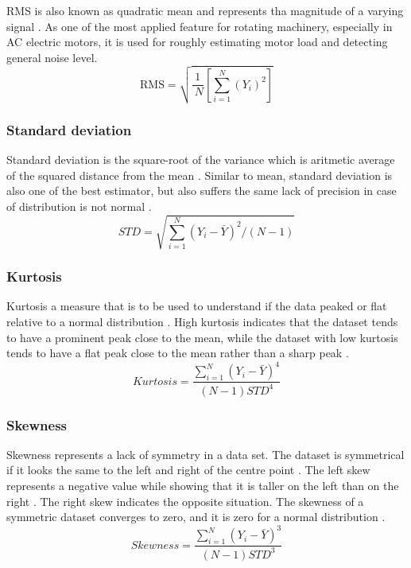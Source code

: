 RMS is also known as quadratic mean and represents tha magnitude of a varying signal \cite{sait2011review,shukla2015analysis}. As one of the most applied feature for rotating machinery, especially in AC electric motors, it is used for roughly estimating motor load and detecting general noise level.
\begin{equation}
\text{RMS}=\sqrt{\frac{1}{{~N}}\left[\sum_{{i}=1}^{{N}}\left({Y}_{{i}}\right)^{2}\right]}	
\label{RMS}
\end{equation}
\subsubsection{Standard deviation}

Standard deviation is the square-root of the variance which is aritmetic average of the squared distance from the mean \cite{shukla2015analysis}. Similar to mean, standard deviation is also one of the best estimator, but also suffers the same lack of precision in case of distribution is not normal \cite{croarkin2012handbook}.
\begin{equation}
\textit{STD}=\sqrt{\sum_{i=1}^{N}\left(Y_{i}-\bar{Y}\right)^{2} /(N-1)}
\label{std}
\end{equation}

\subsubsection{Kurtosis} 

Kurtosis a measure that is to be used to understand if the data peaked or flat relative to a normal distribution \cite{shukla2015analysis}. High kurtosis indicates that the dataset tends to have a prominent peak close to the mean, while the dataset with low kurtosis tends to have a flat peak close to the mean rather than a sharp peak \cite{croarkin2012handbook}.
\begin{equation}
\textit{Kurtosis}=\frac{\sum_{i=1}^{N}\left(Y_{i}-\bar{Y}\right)^{4}}{(N-1) STD^{4}}
\label{kurtosis}
\end{equation}
\subsubsection{Skewness} 

Skewness represents a lack of symmetry in a data set. The dataset is symmetrical if it looks the same to the left and right of the centre point \cite{shukla2015analysis}. The left skew represents a negative value while showing that it is taller on the left than on the right \cite{croarkin2012handbook}. The right skew indicates the opposite situation. The skewness of a symmetric dataset converges to zero, and it is zero for a normal distribution \cite{croarkin2012handbook}.
\begin{equation}
\textit{Skewness}=\frac{\sum_{i=1}^{N}\left(Y_{i}-\bar{Y}\right)^{3}}{(N-1) STD^{3}}
\label{skewness}
\end{equation}

